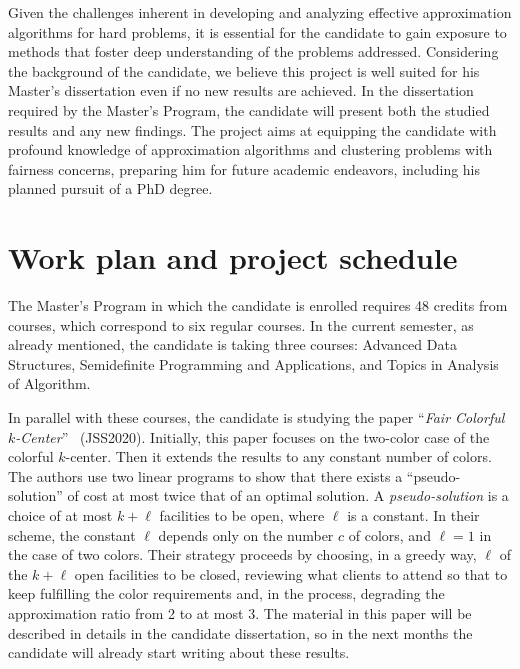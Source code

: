 \documentclass[12pt]{article}
\begin{document}
Given the challenges inherent in developing and analyzing effective approximation algorithms for hard problems, 
it is essential for the candidate to gain exposure to methods that foster deep understanding of the problems addressed.
Considering the background of the candidate, we believe this project is well suited for his Master's dissertation
even if no new results are achieved. 
In the dissertation required by the Master's Program, the candidate will present both the studied results and any new findings.
The project aims at equipping the candidate with profound knowledge of approximation algorithms 
and clustering problems with fairness concerns, preparing him for future academic endeavors, including his planned pursuit of a PhD degree.

\section{Work plan and project schedule}

The Master's Program in which the candidate is enrolled requires 48 credits from courses, which correspond to six regular courses. 
In the current semester, as already mentioned, the candidate is taking three courses: Advanced Data Structures, Semidefinite Programming and Applications, and Topics in Analysis of Algorithm. 

In parallel with these courses, the candidate is studying the paper ``\emph{Fair Colorful $k$-Center}''~\cite{JSS2020} (JSS2020). 
Initially, this paper focuses on the two-color case of the colorful $k$-center. 
Then it extends the results to any constant number of colors. 
The authors use two linear programs to show that there exists a ``pseudo-solution'' of cost at most twice that of an optimal solution. 
A \emph{pseudo-solution} is a choice of at most $k + \ell$ facilities to be open, where $\ell$ is a constant. In their scheme, the constant $\ell$ depends only on the number $c$ of colors, and $\ell = 1$ in the case of two colors.
Their strategy proceeds by choosing, in a greedy way, $\ell$ of the $k+\ell$ open facilities to be closed, reviewing what clients to attend so that to keep fulfilling the color requirements and, in the process, degrading the approximation ratio from 2 to at most 3.
The material in this paper will be described in details in the candidate dissertation, so in the next months the candidate will already start writing about these results.
\end{document}
